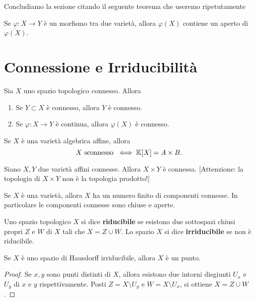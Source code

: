 Concludiamo la sezione citando il seguente teorema che useremo ripetutamente

\begin{theorem}[Chevalley]\label{ThChevalley}
    Se $\varphi\colon X \to Y$ è un morfismo tra due varietà, allora $\varphi(X)$ contiene un aperto di $\overline{\varphi(X)}$.
\end{theorem}

\section{Connessione e Irriducibilit\`a}
Sia $X$ uno spazio topologico connesso. Allora
\begin{enumerate}
    \item Se $Y\subset X$ è connesso, allora $\overline{Y}$ è connesso.
    \item Se $\varphi\colon X \to Y$ è continua, allora $\varphi(X)$ è connesso.
\end{enumerate}

\begin{exercise}
    Se $X$ è una varietà algebrica affine, allora \[X \text{ sconnesso } \iff \mathbb{K}[X]=A\times B.\]
\end{exercise}

\begin{exercise}
    Siano $X,Y$ due varietà affini connesse. Allora $X\times Y$ è connessa. [Attenzione: la topologia di $X\times Y$ non è la topologia prodotto!]
\end{exercise}

\begin{exercise}
    Se $X$ è una varietà, allora $X$ ha un numero finito di componenti connesse. In particolare le componenti connesse sono chiuse e aperte.
\end{exercise}

\begin{definition}
    Uno spazio topologico $X$ si dice \textbf{riducibile} se esistono due sottospazi chiusi propri $Z$ e $W$ di $X$ tali che $X=Z\cup W$. Lo spazio $X$ si dice \textbf{irriducibile} se non è riducibile.
\end{definition}

\begin{proposition}
    Se $X$ è uno spazio di Hausdorff irriducibile, allora $X$ è un punto.
\end{proposition}
\begin{proof}
    Se $x,y$ sono punti distinti di $X$, allora esistono due intorni disgiunti $U_x$ e $U_y$ di $x$ e $y$ rispettivamente. Posti $Z=X\setminus U_y$ e $W=X\setminus U_x$, si ottiene $X=Z\cup W$.
\end{proof}


